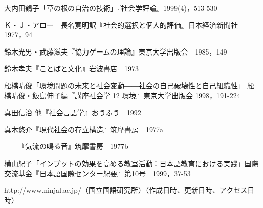 \documentclass[type=master,lang=ja]{sjtuthesis}
\begin{document}
\maketitle

\copyrightpage

\frontmatter

\begin{abstract}[zh]
  
\end{abstract}

\begin{abstract}[en]
  
\end{abstract}

\begin{abstract}[ja]
  
\end{abstract}

\tableofcontents
\listoffigures*
\listoftables*

\mainmatter



\begin{thebibliography}{99}
  \item 大内田鶴子「草の根の自治の技術」『社会学評論』1999(4)，513-530
  \item Ｋ・Ｊ・アロー　長名寛明訳『社会的選択と個人的評価』日本経済新聞社　1977，94
  \item 鈴木光男・武藤滋夫『協力ゲームの理論』東京大学出版会　1985，149
  \item 鈴木孝夫『ことばと文化』岩波書店　1973
  \item 舩橋晴俊「環境問題の未来と社会変動――社会の自己破壊性と自己組織性」
        舩橋晴俊・飯島伸子編『講座社会学 12 環境』東京大学出版会 1998，191-224
  \item 真田信治 他『社会言語学』おうふう　1992
  \item 真木悠介『現代社会の存立構造』筑摩書房　1977a
  \item ------『気流の鳴る音』筑摩書房　1977b
  \item 横山紀子「インプットの効果を高める教室活動：日本語教育における実践」国際交流基金『日本語国際センター紀要』第10号　1999，37-53
  \item http://www.ninjal.ac.jp/（国立国語研究所）（作成日時、更新日時、アクセス日時）
\end{thebibliography}

\appendix

\captionsetup{list=no}



\backmatter







\end{document}
